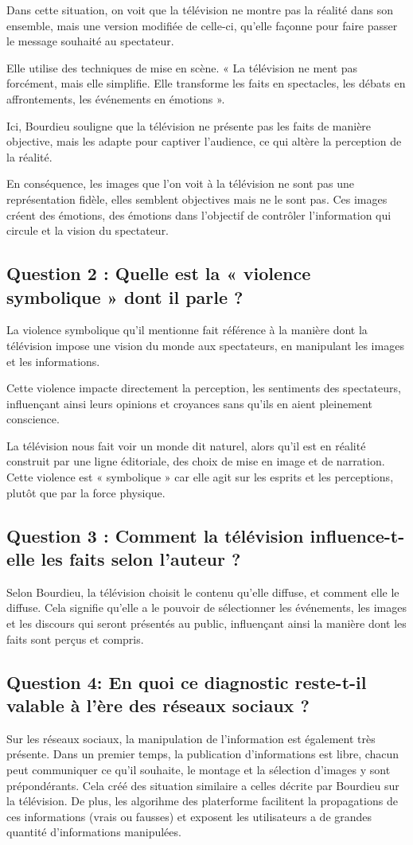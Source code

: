 \documentclass[a4paper,12pt]{article}
\begin{document}
Dans cette situation, on voit que la télévision ne montre pas la réalité dans son ensemble, mais une version modifiée de celle-ci, qu'elle façonne pour faire passer le message souhaité au spectateur.

Elle utilise des techniques de mise en scène. « La télévision ne ment pas forcément, mais elle simplifie. Elle transforme les faits en spectacles, les débats en affrontements, les événements en émotions ». 

Ici, Bourdieu souligne que la télévision ne présente pas les faits de manière objective, mais les adapte pour captiver l'audience, ce qui altère la perception de la réalité.

En conséquence, les images que l'on voit à la télévision ne sont pas une représentation fidèle, elles semblent objectives mais ne le sont pas. Ces images créent des émotions, des émotions dans l'objectif de contrôler l'information qui circule et la vision du spectateur.

\subsection*{Question 2 : Quelle est la « violence symbolique » dont il parle ?}
La violence symbolique qu'il mentionne fait référence à la manière dont la télévision impose une vision du monde aux spectateurs, en manipulant les images et les informations.

Cette violence impacte directement la perception, les sentiments des spectateurs, influençant ainsi leurs opinions et croyances sans qu'ils en aient pleinement conscience.

La télévision nous fait voir un monde dit naturel, alors qu'il est en réalité construit par une ligne éditoriale, des choix de mise en image et de narration. Cette violence est « symbolique » car elle agit sur les esprits et les perceptions, plutôt que par la force physique.
\subsection*{Question 3 : Comment la télévision influence-t-elle les faits selon l'auteur ?}
Selon Bourdieu, la télévision choisit le contenu qu'elle diffuse, et comment elle le diffuse. 
Cela signifie qu'elle a le pouvoir de sélectionner les événements, les images et les discours qui seront présentés au public, influençant ainsi la manière dont les faits sont perçus et compris.

\subsection*{Question 4: En quoi ce diagnostic reste-t-il valable à l'ère des réseaux sociaux ?}
Sur les réseaux sociaux, la manipulation de l'information est également très présente. Dans un premier temps, la publication d'informations est libre, chacun peut communiquer ce qu'il souhaite, le montage et la sélection d'images y sont prépondérants.
Cela créé des situation similaire a celles décrite par Bourdieu sur la télévision. De plus, les algorihme des platerforme facilitent la propagations de ces informations (vrais ou fausses) et exposent les utilisateurs a de grandes quantité d'informations manipulées.
\end{document}
